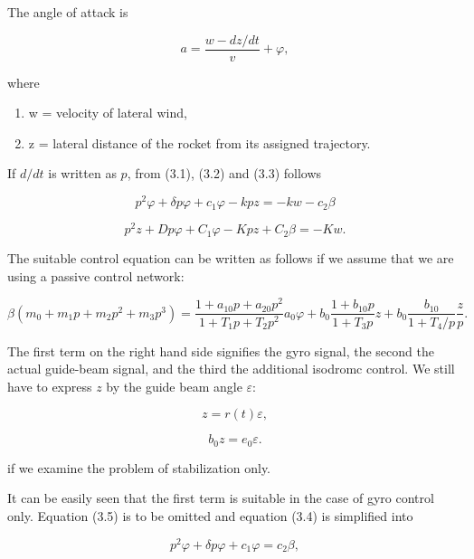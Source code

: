 \documentclass[12pt, a4paper]{article}
\begin{document}
The angle of attack is

\begin{equation}
  a=\dfrac{w-dz/ dt}{v}+\varphi,
\end{equation}

where

\begin{enumerate}[label={}]
  \item w = velocity of lateral wind,
  \item z = lateral distance of the rocket from its assigned trajectory.
\end{enumerate}

If $d/dt$ is written as $p$, from (3.1), (3.2) and (3.3) follows

\begin{equation}
  p^{2}\varphi+\delta p\varphi+c_{1}\varphi-kpz=-kw-c_{2}\beta
\end{equation}

\begin{equation}
  p^{2}z+D p\varphi+C_{1}\varphi-Kpz+C_{2}\beta=-Kw.
\end{equation}

The suitable control equation can be written as follows if we assume that we
are using a passive control network:

\begin{equation}
  \beta(m_{0}+m_{1}p+m_{2}p^{2}+m_{3}p^{3})=\frac{1+a_{10}p+a_{20}p^{2}}{1+T_{1}p+T_{2}p^{2}}a_{0}\varphi+b_{0}\frac{1+b_{10}p}{1+T_{3}p}z+b_{0}\frac{b_{10}}{1+T_{4}/p}\frac{z}{p}.
\end{equation}

The first term on the right hand side signifies the gyro signal, the second the actual guide-beam signal, and the third the additional isodromc control. We still have to express $z$ by the guide beam angle $\varepsilon$:

\begin{equation}
  z=r(t)\varepsilon,
\end{equation}

\begin{equation}
  b_{0}z=e_{0}\varepsilon.
\end{equation}

if we examine the problem of stabilization only.

It can be easily seen that the first term is suitable in the case of gyro control only. Equation (3.5) is to be omitted and equation (3.4) is simplified into

\begin{equation}
  p^{2}\varphi+\delta p\varphi+c_{1}\varphi=c_{2}\beta,
\end{equation}
\end{document}
